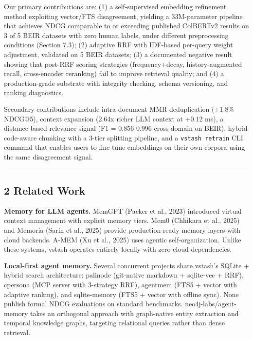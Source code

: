 \documentclass[
  11pt]{article}
\begin{document}
Our primary contributions are: (1) a self-supervised embedding refinement method exploiting vector/FTS disagreement, yielding a 33M-parameter pipeline that achieves NDCG comparable to or exceeding published ColBERTv2 results on 3 of 5 BEIR datasets with zero human labels, under different preprocessing conditions (Section 7.3); (2) adaptive RRF with IDF-based per-query weight adjustment, validated on 5 BEIR datasets; (3) a documented negative result showing that post-RRF scoring strategies (frequency+decay, history-augmented recall, cross-encoder reranking) fail to improve retrieval quality; and (4) a production-grade substrate with integrity checking, schema versioning, and ranking diagnostics.

Secondary contributions include intra-document MMR deduplication (+1.8\% NDCG@5), context expansion (2.64x richer LLM context at +0.12 ms), a distance-based relevance signal (F1 = 0.856-0.996 cross-domain on BEIR), hybrid code-aware chunking with a 3-tier splitting pipeline, and a \texttt{vstash\ retrain} CLI command that enables users to fine-tune embeddings on their own corpora using the same disagreement signal.

\begin{center}\rule{0.5\linewidth}{0.5pt}\end{center}

\subsection{2 Related Work}\label{related-work}

\textbf{Memory for LLM agents.} MemGPT (Packer et al., 2023) introduced virtual context management with explicit memory tiers. Mem0 (Chhikara et al., 2025) and Memoria (Sarin et al., 2025) provide production-ready memory layers with cloud backends. A-MEM (Xu et al., 2025) uses agentic self-organization. Unlike these systems, vstash operates entirely locally with zero cloud dependencies.

\textbf{Local-first agent memory.} Several concurrent projects share vstash's SQLite + hybrid search architecture: palinode (git-native markdown + sqlite-vec + RRF), cpersona (MCP server with 3-strategy RRF), agentmem (FTS5 + vector with adaptive ranking), and sqlite-memory (FTS5 + vector with offline sync). None publish formal NDCG evaluations on standard benchmarks. neo4j-labs/agent-memory takes an orthogonal approach with graph-native entity extraction and temporal knowledge graphs, targeting relational queries rather than dense retrieval.
\end{document}
